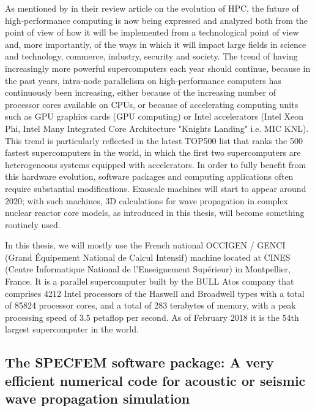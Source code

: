 \noindent
As mentioned by \cite{GrSt15} in their review article on the evolution of HPC, the future of high-performance computing is now being expressed and analyzed both from the point of view of how it will be implemented from a technological point of view and, more importantly, of the ways in which it will impact large fields in science and technology, commerce, industry, security and society. The trend of having increasingly more powerful supercomputers each year should continue, because in the past years, intra-node parallelism on high-performance computers has continuously been increasing, either because of the increasing number of processor cores available on CPUs, or because of accelerating computing units such as GPU graphics cards (GPU computing) or Intel accelerators (Intel Xeon Phi, Intel Many Integrated Core Architecture "Knights Landing" i.e. MIC KNL). This trend is particularly reflected in the latest TOP500 list that ranks the 500 fastest supercomputers in the world, in which the first two supercomputers are heterogeneous systems equipped with accelerators. In order to fully benefit from this hardware evolution, software packages and computing applications often require substantial modifications. Exascale machines will start to appear around 2020; with such machines, 3D calculations for wave propagation in complex nuclear reactor core models, as introduced in this thesis, will become something routinely used.

In this thesis, we will mostly use the French national OCCIGEN / GENCI (Grand \'Equipement National de Calcul Intensif) machine located at CINES (Centre Informatique National de l'Enseignement Sup\'erieur) in Montpellier, France. It is a parallel supercomputer built by the BULL Atos company that comprises 4212 Intel processors of the Haswell and Broadwell types with a total of 85824 processor cores, and a total of 283 terabytes of memory, with a peak processing speed of 3.5 petaflop per second. As of February 2018 it is the 54th largest supercomputer in the world.


    \subsection{The SPECFEM software package: A very efficient numerical code for acoustic or seismic wave propagation simulation}

